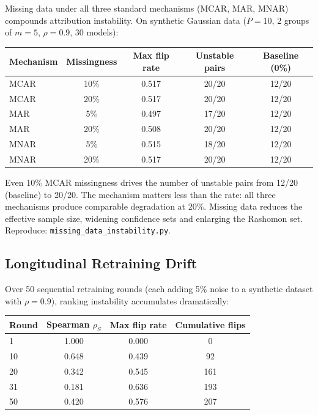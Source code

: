 \documentclass{article}
\begin{document}
Missing data under all three standard mechanisms (MCAR, MAR, MNAR) compounds attribution instability. On synthetic Gaussian data ($P{=}10$, 2 groups of $m{=}5$, $\rho{=}0.9$, 30 models):

\begin{center}
\small
\begin{tabular}{@{}lcccc@{}}
\toprule
Mechanism & Missingness & Max flip rate & Unstable pairs & Baseline (0\%) \\
\midrule
MCAR & 10\% & 0.517 & 20/20 & 12/20 \\
MCAR & 20\% & 0.517 & 20/20 & 12/20 \\
MAR  & 5\%  & 0.497 & 17/20 & 12/20 \\
MAR  & 20\% & 0.508 & 20/20 & 12/20 \\
MNAR & 5\%  & 0.515 & 18/20 & 12/20 \\
MNAR & 20\% & 0.517 & 20/20 & 12/20 \\
\bottomrule
\end{tabular}
\end{center}

Even 10\% MCAR missingness drives the number of unstable pairs from 12/20 (baseline) to 20/20. The mechanism matters less than the rate: all three mechanisms produce comparable degradation at 20\%. Missing data reduces the effective sample size, widening confidence sets and enlarging the Rashomon set.
Reproduce: \texttt{missing\_data\_instability.py}.

\subsection{Longitudinal Retraining Drift}
\label{sec:longitudinal}

Over 50 sequential retraining rounds (each adding 5\% noise to a synthetic dataset with $\rho{=}0.9$), ranking instability accumulates dramatically:

\begin{center}
\small
\begin{tabular}{@{}lccc@{}}
\toprule
Round & Spearman $\rho_S$ & Max flip rate & Cumulative flips \\
\midrule
1   & 1.000 & 0.000 & 0 \\
10  & 0.648 & 0.439 & 92 \\
20  & 0.342 & 0.545 & 161 \\
31  & 0.181 & 0.636 & 193 \\
50  & 0.420 & 0.576 & 207 \\
\bottomrule
\end{tabular}
\end{center}
\end{document}
